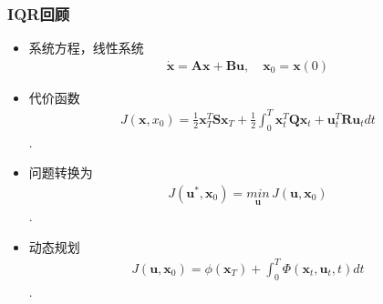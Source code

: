 \documentclass[UTF8, aspectratio=169, 9pt]{ctexbeamer}
\begin{document}
\begin{frame}
  \frametitle{IQR回顾}

  \begin{itemize}
  \item 系统方程，线性系统
    \begin{align}
      \dot{ \boldsymbol{ x } } = \boldsymbol{ A x } + \boldsymbol{ B u }, \quad
      \boldsymbol{x}_0 = \boldsymbol{x}(0)
    \end{align}

  \item 代价函数
    \begin{align}
      J(\boldsymbol{x}, x_0) = \frac{1}{2} \boldsymbol{x}^T_T \boldsymbol{S}
      \boldsymbol{ x }_T + \frac{1}{2} \int_0^T \boldsymbol{x}^T_t
      \boldsymbol{Q} \boldsymbol{x}_t + \boldsymbol{u}^T_t \boldsymbol{R}
      \boldsymbol{u}_t dt
    \end{align}.

  \item 问题转换为
    \begin{align}
      J( \boldsymbol{u}^{*}, \boldsymbol{x}_0 ) = \underset{ \boldsymbol{u}
      }{min}  \, J(
      \boldsymbol{u}, \boldsymbol{x}_0 )
    \end{align}.

  \item 动态规划
    \begin{align}
       J( \boldsymbol{u}, \boldsymbol{x}_0 ) = \phi( \boldsymbol{x}_{T} ) + \int_0^T
      \Phi( \boldsymbol{x}_t,  \boldsymbol{u}_t, t ) dt
    \end{align}.

  \end{itemize}
\end{frame}
\end{document}
